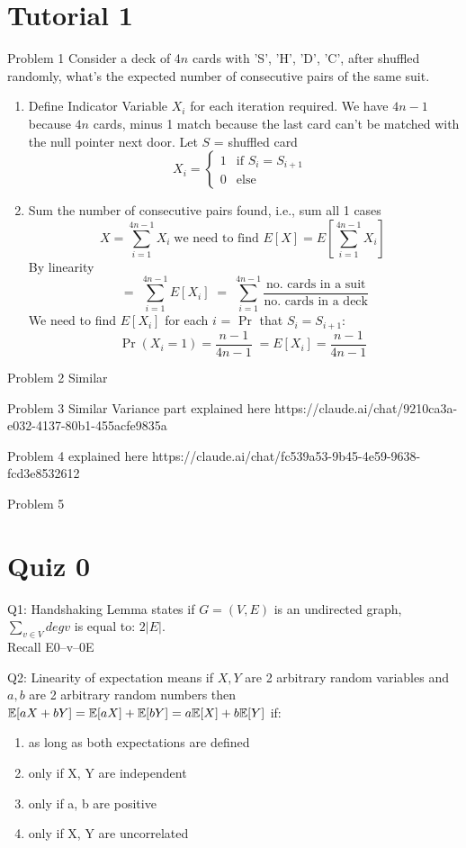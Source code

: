 \section*{Tutorial 1}
Problem 1
Consider a deck of 4$n$ cards with 'S', 'H', 'D', 'C', after shuffled randomly, what's the expected number of consecutive pairs of the same suit.
\begin{enumerate}
    \item Define Indicator Variable $X_i$ for each iteration required. We have $4n-1$ because $4n$ cards, minus 1 match because the last card can't be matched with the null pointer next door. Let $S$ = shuffled card
    \[
    X_i =
    \begin{cases} 
    1 & \text{if $S_i = S_{i + 1}$ } \\
    0 & \text{else}
    \end{cases}
    \]
    \item Sum the number of consecutive pairs found, i.e., sum all 1 cases
    \[
        X = \sum_{i=1}^{4n-1} X_i \; \text{we need to find }E[X] = E[\sum_{i=1}^{4n-1} X_i] \;
    \]
    By linearity
    \[
         = \;  \sum_{i=1}^{4n-1} E[X_i] \; = \;  \sum_{i=1}^{4n-1} \frac{\text{no. cards in a suit}}{\text{no. cards in a deck}}
    \]
    We need to find $E[X_i]$ for each $i$ = $\Pr$ that $S_i = S_{i + 1}$:
    \[
        \Pr(X_i = 1) = \frac{n-1}{4n-1} \; = E[X_i] = \frac{n-1}{4n-1}\; 
    \]
\end{enumerate}

Problem 2
Similar

Problem 3
Similar
Variance part explained here https://claude.ai/chat/9210ca3a-e032-4137-80b1-455acfe9835a

Problem 4
explained here https://claude.ai/chat/fc539a53-9b45-4e59-9638-fcd3e8532612 

Problem 5




\section*{Quiz 0}
Q1: Handshaking Lemma states if $G = (V,E)$ is an undirected graph, $\sum_{v \in V}^{} deg v$ is equal to: $2|E|$. \\
Recall E0--v--0E 

Q2: Linearity of expectation means if $X, Y$ are 2 arbitrary random variables and $a, b$ are 2 arbitrary random numbers then $\mathbb{E} [aX + bY] = \mathbb{E}[aX] + \mathbb{E}[bY] = a\mathbb{E}[X] + b\mathbb{E}[Y]$ if:
\begin{enumerate}
    \item as long as both expectations are defined
    \item only if X, Y are independent
    \item only if a, b are positive
    \item only if X, Y are uncorrelated
\end{enumerate}

